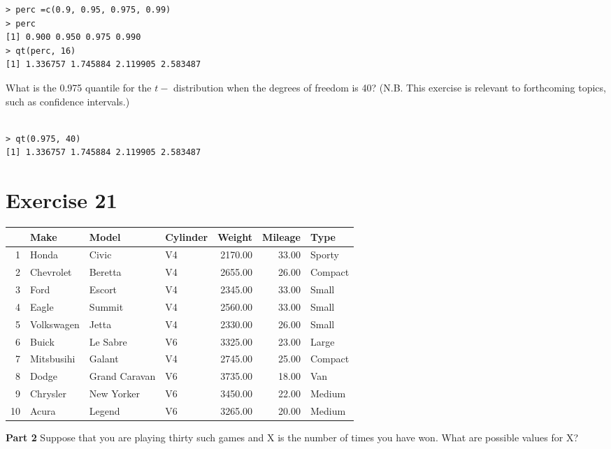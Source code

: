 \begin{verbatim}
> perc =c(0.9, 0.95, 0.975, 0.99)
> perc
[1] 0.900 0.950 0.975 0.990
> qt(perc, 16)
[1] 1.336757 1.745884 2.119905 2.583487
\end{verbatim}

What is the 0.975 quantile for the $t-$ distribution when the degrees of freedom is 40?
(N.B. This exercise is relevant to forthcoming topics, such as confidence intervals.)

\begin{verbatim}

> qt(0.975, 40)
[1] 1.336757 1.745884 2.119905 2.583487
\end{verbatim}

\section*{Exercise 21}

\begin{table}[ht]
\begin{center}
\begin{tabular}{rlllrrl}
\hline
& Make & Model & Cylinder & Weight & Mileage & Type \\
\hline
1 & Honda & Civic & V4 & 2170.00 & 33.00 & Sporty \\
2 & Chevrolet & Beretta & V4 & 2655.00 & 26.00 & Compact \\
3 & Ford & Escort & V4 & 2345.00 & 33.00 & Small \\
4 & Eagle & Summit & V4 & 2560.00 & 33.00 & Small \\
5 & Volkswagen & Jetta & V4 & 2330.00 & 26.00 & Small \\
6 & Buick & Le Sabre & V6 & 3325.00 & 23.00 & Large \\
7 & Mitsbusihi & Galant & V4 & 2745.00 & 25.00 & Compact \\
8 & Dodge & Grand Caravan & V6 & 3735.00 & 18.00 & Van \\
9 & Chrysler & New Yorker & V6 & 3450.00 & 22.00 & Medium \\
10 & Acura & Legend & V6 & 3265.00 & 20.00 & Medium \\
\hline
\end{tabular}
\end{center}
\end{table}







\noindent\textbf{Part 2} Suppose that you are playing thirty such games and X is the number of times you have won.
What are possible values for X?


